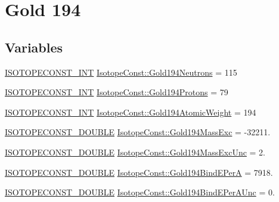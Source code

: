 \hypertarget{group___isotope_const-_gold-_au194}{}\section{Gold 194}
\label{group___isotope_const-_gold-_au194}
\subsection*{Variables}
\begin{DoxyCompactItemize}
\item 
\mbox{\hyperlink{group___isotope_const-_macros_ga5f18360b3e99483a35c32d789e62621c}{I\+S\+O\+T\+O\+P\+E\+C\+O\+N\+S\+T\+\_\+\+I\+NT}} \mbox{\hyperlink{group___isotope_const-_gold-_au194_ga6ff869cac154be0fec5835ea4fade7bf}{Isotope\+Const\+::\+Gold194\+Neutrons}} = 115
\item 
\mbox{\hyperlink{group___isotope_const-_macros_ga5f18360b3e99483a35c32d789e62621c}{I\+S\+O\+T\+O\+P\+E\+C\+O\+N\+S\+T\+\_\+\+I\+NT}} \mbox{\hyperlink{group___isotope_const-_gold-_au194_ga12fa91472d53bd9053c4722a9d47c833}{Isotope\+Const\+::\+Gold194\+Protons}} = 79
\item 
\mbox{\hyperlink{group___isotope_const-_macros_ga5f18360b3e99483a35c32d789e62621c}{I\+S\+O\+T\+O\+P\+E\+C\+O\+N\+S\+T\+\_\+\+I\+NT}} \mbox{\hyperlink{group___isotope_const-_gold-_au194_gaf6e772e3ead76240089b079afa13c11d}{Isotope\+Const\+::\+Gold194\+Atomic\+Weight}} = 194
\item 
\mbox{\hyperlink{group___isotope_const-_macros_ga8f45a7272ce02c0b4c65c44636ed719a}{I\+S\+O\+T\+O\+P\+E\+C\+O\+N\+S\+T\+\_\+\+D\+O\+U\+B\+LE}} \mbox{\hyperlink{group___isotope_const-_gold-_au194_gaf884a649cfb7a0029da13cc13d5645a3}{Isotope\+Const\+::\+Gold194\+Mass\+Exc}} = -\/32211.
\item 
\mbox{\hyperlink{group___isotope_const-_macros_ga8f45a7272ce02c0b4c65c44636ed719a}{I\+S\+O\+T\+O\+P\+E\+C\+O\+N\+S\+T\+\_\+\+D\+O\+U\+B\+LE}} \mbox{\hyperlink{group___isotope_const-_gold-_au194_gac75d07e1a12dc42cfe7520f218c37558}{Isotope\+Const\+::\+Gold194\+Mass\+Exc\+Unc}} = 2.
\item 
\mbox{\hyperlink{group___isotope_const-_macros_ga8f45a7272ce02c0b4c65c44636ed719a}{I\+S\+O\+T\+O\+P\+E\+C\+O\+N\+S\+T\+\_\+\+D\+O\+U\+B\+LE}} \mbox{\hyperlink{group___isotope_const-_gold-_au194_ga600d1b0178a7d90eee789fe9be4b5f11}{Isotope\+Const\+::\+Gold194\+Bind\+E\+PerA}} = 7918.
\item 
\mbox{\hyperlink{group___isotope_const-_macros_ga8f45a7272ce02c0b4c65c44636ed719a}{I\+S\+O\+T\+O\+P\+E\+C\+O\+N\+S\+T\+\_\+\+D\+O\+U\+B\+LE}} \mbox{\hyperlink{group___isotope_const-_gold-_au194_ga14374373e4e5abeb0815a3c6f5be77f5}{Isotope\+Const\+::\+Gold194\+Bind\+E\+Per\+A\+Unc}} = 0.

\end{DoxyCompactItemize}
